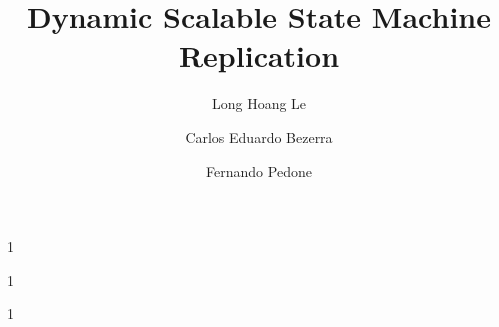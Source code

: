 \documentclass{usiinftr}
\newcommand{\dssmrlong}{Dynamic Scalable State Machine Replication}
\begin{document}
\title{\dssmrlong}




\author{Long Hoang Le}{1}
\author{Carlos Eduardo Bezerra}{1}
\author{Fernando Pedone}{1}



\maketitle
\thispagestyle{plain}
\pagestyle{plain}
%













%


\newpage
\end{document}
